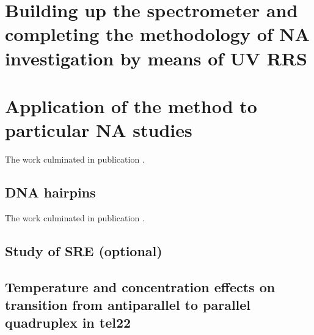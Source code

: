 \chapter[%
	Building up the spectrometer and completing the methodology of NA
	investigation by means of UV RRS
]{%
	Building up the spectrometer and completing the methodology of NA
	investigation by means of UV RRS
}
\label{spectrometer_building}








\chapter[%
	Application of the method to particular NA studies
]{%
	Application of the method to particular NA studies
}

The work culminated in publication \textcite{Klener2015}.

\section{DNA hairpins}

The work culminated in publication \textcite{Klener2021}.

\section{Study of SRE (optional)}

\section[%
	Temperature and concentration effects on transition from antiparallel	to
	parallel quadruplex in tel22 (optional)
]{%
	Temperature and concentration effects on transition from antiparallel to
	parallel\\quadruplex in tel22
}
